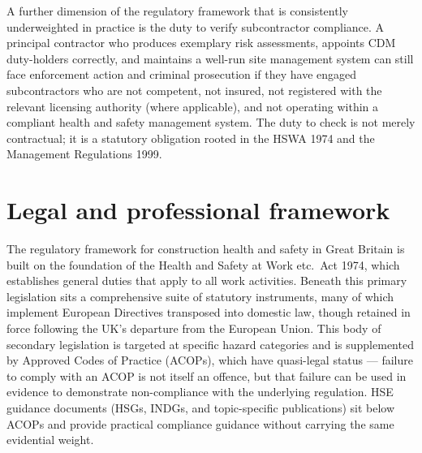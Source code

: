 A further dimension of the regulatory framework that is consistently underweighted in practice is the duty to verify subcontractor compliance. A principal contractor who produces exemplary risk assessments, appoints CDM duty-holders correctly, and maintains a well-run site management system can still face enforcement action and criminal prosecution if they have engaged subcontractors who are not competent, not insured, not registered with the relevant licensing authority (where applicable), and not operating within a compliant health and safety management system. The duty to check is not merely contractual; it is a statutory obligation rooted in the HSWA 1974 and the Management Regulations 1999.



\section{Legal and professional framework}

The regulatory framework for construction health and safety in Great Britain is built on the foundation of the Health and Safety at Work etc.\ Act 1974, which establishes general duties that apply to all work activities. Beneath this primary legislation sits a comprehensive suite of statutory instruments, many of which implement European Directives transposed into domestic law, though retained in force following the UK's departure from the European Union. This body of secondary legislation is targeted at specific hazard categories and is supplemented by Approved Codes of Practice (ACOPs), which have quasi-legal status --- failure to comply with an ACOP is not itself an offence, but that failure can be used in evidence to demonstrate non-compliance with the underlying regulation. HSE guidance documents (HSGs, INDGs, and topic-specific publications) sit below ACOPs and provide practical compliance guidance without carrying the same evidential weight.

